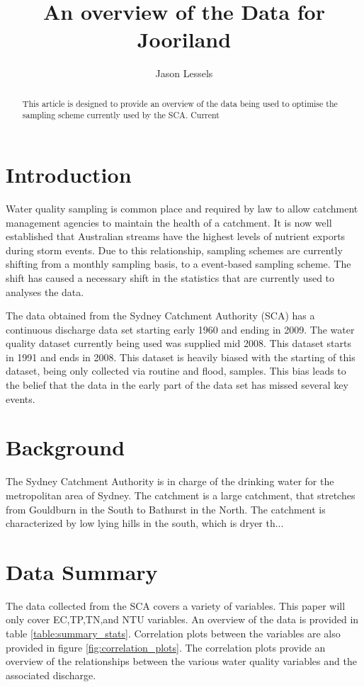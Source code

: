 \documentclass[5p]{elsarticle}
\begin{document}
\begin{frontmatter}
\title{An overview of the Data for Jooriland}
\author[jsl]{Jason Lessels}
\address[jsl]{The University of Sydney}
\begin{abstract}
This article is designed to provide an overview of the data being used to optimise the sampling scheme currently used by the SCA. Current
\end{abstract}
\begin{keyword}
\end{keyword}

\end{frontmatter}
\section*{Introduction}
Water quality sampling is common place and required by law to allow catchment management agencies to maintain the health of a catchment. It is now well established that Australian streams have the highest levels of nutrient exports during storm events. Due to this relationship, sampling schemes are currently shifting from a monthly sampling basis, to a event-based sampling scheme. The shift has caused a necessary shift in the statistics that are currently used to analyses the data.

The data obtained from the Sydney Catchment Authority (SCA) has a continuous discharge data set starting early 1960 and ending in 2009. The water quality dataset currently being used was supplied mid 2008. This dataset starts in 1991 and ends in 2008. This dataset is heavily biased with the starting of this dataset, being only collected via routine and flood, samples. This bias leads to the belief that the data in the early part of the data set has missed several key events.
\section*{Background}
The Sydney Catchment Authority is in charge of the drinking water for the metropolitan area of Sydney. The catchment is a large catchment, that stretches from Gouldburn in the South to Bathurst in the North. The catchment is characterized by low lying hills in the south, which is dryer th...

\section*{Data Summary}
The data collected from the SCA covers a variety of variables. This paper will only cover EC,TP,TN,and NTU variables. An overview of the data is provided in table \ref{table:summary_stats}. Correlation plots between the variables are also provided in figure \ref{fig:correlation_plots}. The correlation plots provide an overview of the relationships between the various water quality variables and the associated discharge. 
\end{document}
